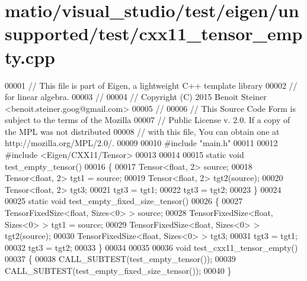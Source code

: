 \hypertarget{matio_2visual__studio_2test_2eigen_2unsupported_2test_2cxx11__tensor__empty_8cpp_source}{}\section{matio/visual\+\_\+studio/test/eigen/unsupported/test/cxx11\+\_\+tensor\+\_\+empty.cpp}
\label{matio_2visual__studio_2test_2eigen_2unsupported_2test_2cxx11__tensor__empty_8cpp_source}

\begin{DoxyCode}
00001 \textcolor{comment}{// This file is part of Eigen, a lightweight C++ template library}
00002 \textcolor{comment}{// for linear algebra.}
00003 \textcolor{comment}{//}
00004 \textcolor{comment}{// Copyright (C) 2015 Benoit Steiner <benoit.steiner.goog@gmail.com>}
00005 \textcolor{comment}{//}
00006 \textcolor{comment}{// This Source Code Form is subject to the terms of the Mozilla}
00007 \textcolor{comment}{// Public License v. 2.0. If a copy of the MPL was not distributed}
00008 \textcolor{comment}{// with this file, You can obtain one at http://mozilla.org/MPL/2.0/.}
00009 
00010 \textcolor{preprocessor}{#include "main.h"}
00011 
00012 \textcolor{preprocessor}{#include <Eigen/CXX11/Tensor>}
00013 
00014 
00015 \textcolor{keyword}{static} \textcolor{keywordtype}{void} test\_empty\_tensor()
00016 \{
00017   Tensor<float, 2> source;
00018   Tensor<float, 2> tgt1 = source;
00019   Tensor<float, 2> tgt2(source);
00020   Tensor<float, 2> tgt3;
00021   tgt3 = tgt1;
00022   tgt3 = tgt2;
00023 \}
00024 
00025 \textcolor{keyword}{static} \textcolor{keywordtype}{void} test\_empty\_fixed\_size\_tensor()
00026 \{
00027   TensorFixedSize<float, Sizes<0> > source;
00028   TensorFixedSize<float, Sizes<0> > tgt1 = source;
00029   TensorFixedSize<float, Sizes<0> > tgt2(source);
00030   TensorFixedSize<float, Sizes<0> > tgt3;
00031   tgt3 = tgt1;
00032   tgt3 = tgt2;
00033 \}
00034 
00035 
00036 \textcolor{keywordtype}{void} test\_cxx11\_tensor\_empty()
00037 \{
00038    CALL\_SUBTEST(test\_empty\_tensor());
00039    CALL\_SUBTEST(test\_empty\_fixed\_size\_tensor());
00040 \}
\end{DoxyCode}
